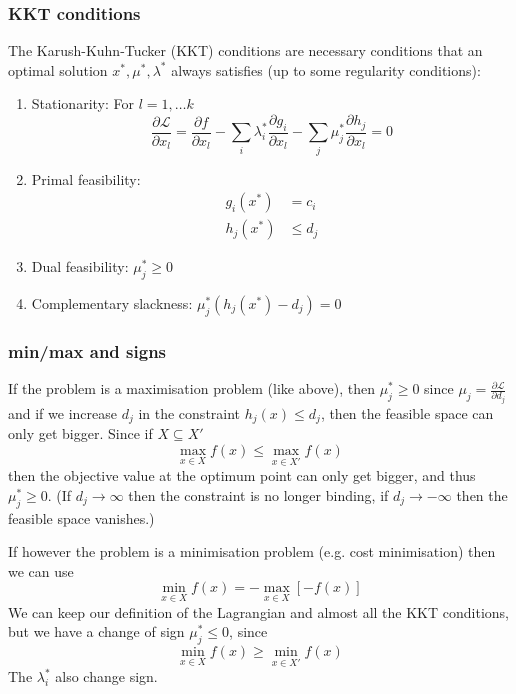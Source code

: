 \documentclass[10pt,dvipsnames]{beamer}
\def\l{\lambda}
\def\m{\mu}
\def\d{\partial}
\def\cL{\mathcal{L}}
\let\olditem\item
\renewcommand{\item}{%
\olditem\vspace{5pt}}
\begin{document}
\begin{frame}
  \frametitle{KKT conditions}

The \alert{Karush-Kuhn-Tucker (KKT) conditions} are necessary conditions that an optimal solution $x^*,\m^*,\l^*$ always satisfies (up to some regularity conditions):
\begin{enumerate}
\item \alert{Stationarity}: For $l = 1,\dots k$
  \begin{equation*}
  \frac{\d \cL}{\d x_l} =   \frac{\d f}{\d x_l} - \sum_i \l_i^* \frac{\d g_i}{\d x_l}  - \sum_j \m_j^* \frac{\d h_j}{\d x_l} = 0
  \end{equation*}
    \item \alert{Primal feasibility}:
      \begin{align*}
        g_i(x^*) & = c_i \\
        h_j(x^*) &\leq d_j
      \end{align*}
    \item \alert{Dual feasibility}: $\m_j^* \geq 0$
    \item \alert{Complementary slackness}: $\m_j^* (h_j(x^*) - d_j) = 0$
\end{enumerate}

\end{frame}

\begin{frame}
  \frametitle{min/max and signs}

  If the problem is a \alert{maximisation} problem (like above), then
  \alert{$\m_j^* \geq 0$} since $\m_j = \frac{\d \cL}{\d d_j}$ and if we
  increase $d_j$ in the constraint $h_j(x) \leq d_j$, then the
  feasible space can only get bigger. Since if $X \subseteq X'$
  \begin{equation*}
 \max_{x\in X} f(x ) \leq     \max_{x\in X'} f(x)
  \end{equation*}
  then the objective value at the optimum point can only get bigger, and thus $\m_j^* \geq 0$. (If $d_j \to \infty$
  then the constraint is no longer binding, if $d_j \to -\infty$ then
  the feasible space vanishes.)

  If however the problem is a \alert{minimisation} problem (e.g. cost minimisation) then we can use
  \begin{equation*}
      \min_{x\in X} f(x) = - \max_{x\in X} \left[ -f(x)\right]
  \end{equation*}
  We can keep our definition of the Lagrangian and almost all the KKT
  conditions, but we have a change of sign \alert{$\m_j^* \leq 0$}, since
  \begin{equation*}
   \min_{x\in X} f(x ) \geq     \min_{x\in X'} f(x)
  \end{equation*}
  The $\l_i^*$ also change sign.

\end{frame}
\end{document}
